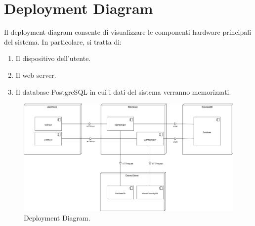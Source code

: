 \section{Deployment Diagram}
Il deployment diagram consente di visualizzare le componenti hardware principali del sistema.
In particolare, si tratta di:
\begin{enumerate}
	\item Il dispositivo dell'utente.
	\item Il web server.
	\item Il database PostgreSQL in cui i dati del sistema verranno memorizzati.
\end{enumerate}

\begin{figure}[h!]
	\centering
	\includegraphics[width=0.8\linewidth]{diagrammi/Deployment.drawio.png}
	\caption{Deployment Diagram.}
	\label{fig:DeploymentDiagram}
\end{figure}
